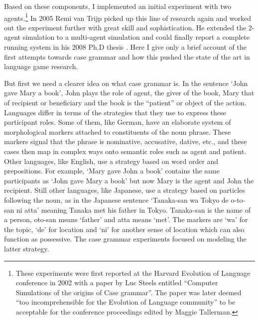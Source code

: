 Based on these components, I implemented an initial experiment with two agents.\footnote{These experiments were first reported at the Harvard Evolution of Language conference in 2002 with a paper by Luc Steels
entitled ``Computer Simulations of the origins of Case grammar''. The paper was later deemed 
``too incomprehensible for the Evolution of Language community'' to be acceptable for the conference 
proceedings edited by Maggie Tallerman.}
In 2005 Remi van Trijp picked up this line of research again and worked out the experiment 
further with great skill and sophistication. He extended the 
2-agent simulation to a multi-agent simulation and could finally report a complete running system in his 2008 Ph.D 
thesis \citep{VanTrijp:2014}. Here I give only a brief account of the first attempts towards case grammar
and how this pushed the state of the art in language game research. 

But first we need a clearer idea on what case grammar is.
In the sentence `John gave Mary a book', John plays the role of agent, the giver 
of the book, Mary that of recipient or 
beneficiary and the book is the ``patient'' or object of the action. Languages differ in terms of the strategies that they 
use to express these participant roles. Some of them, like German, have an elaborate system of morphological 
markers attached to constituents of the noun phrase. These markers signal that the 
phrase is nominative, accusative, dative, etc., and these cases then map in complex ways 
onto semantic roles such as agent and patient.
Other languages, like English, use a strategy based on word order and prepositions. For example, 
`Mary gave John a book' contains the same participants as `John gave Mary a book' but now Mary is the 
agent and John the recipient. Still other languages, like Japanese, use a strategy based on particles following 
the noun, as in the Japanese sentence `Tanaka-san wa Tokyo de o-to-san ni atta' 
meaning Tanaka met his father in Tokyo. Tanaka-san is the name of a person, oto-san means `father' and atta 
means `met'. The markers are `wa' for the topic, `de' for location and `ni' for another sense of location which can 
also function as possessive. The case grammar experiments focused on modeling the latter strategy. 


